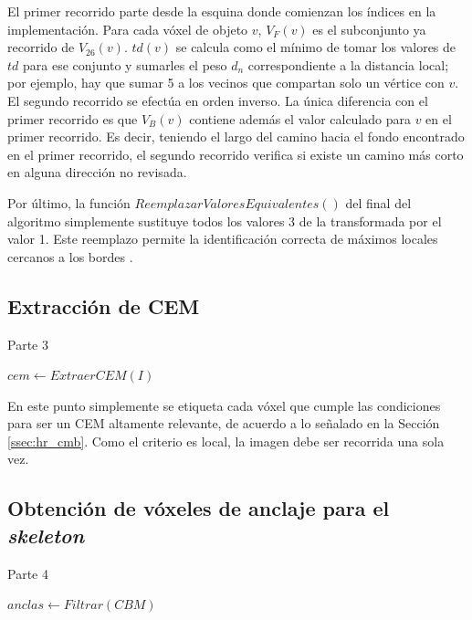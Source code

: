 El primer recorrido parte desde la esquina donde comienzan los índices en la implementación. Para cada vóxel de objeto $v$, $V_F(v)$ es el subconjunto ya recorrido de $V_{26}(v)$. $td(v)$ se calcula como el mínimo de tomar los valores de $td$ para ese conjunto y sumarles el peso $d_n$ correspondiente a la distancia local; por ejemplo, hay que sumar 5 a los vecinos que compartan solo un vértice con $v$. El segundo recorrido se efectúa en orden inverso. La única diferencia con el primer recorrido es que $V_B(v)$ contiene además el valor calculado para $v$ en el primer recorrido. Es decir, teniendo el largo del camino hacia el fondo encontrado en el primer recorrido, el segundo recorrido verifica si existe un camino más corto en alguna dirección no revisada.

Por último, la función $ReemplazarValoresEquivalentes()$ del final del algoritmo simplemente sustituye todos los valores 3 de la transformada por el valor 1. Este reemplazo permite la identificación correcta de máximos locales cercanos a los bordes \cite{arcelli1988finding}.

\subsection{Extracción de CEM}

\begin{algorithm}[H]
\caption{Parte 3}
\begin{algorithmic}[1]
\State $cem \gets ExtraerCEM(I)$
\end{algorithmic}
\end{algorithm}

En este punto simplemente se etiqueta cada vóxel que cumple las condiciones para ser un CEM altamente relevante, de acuerdo a lo señalado en la Sección \ref{ssec:hr_cmb}. Como el criterio es local, la imagen debe ser recorrida una sola vez.

\subsection{Obtención de vóxeles de anclaje para el \textit{skeleton}}

\begin{algorithm}[H]
\caption{Parte 4}
\begin{algorithmic}[1]
\State $anclas \gets Filtrar(CBM)$
\end{algorithmic}
\end{algorithm}

